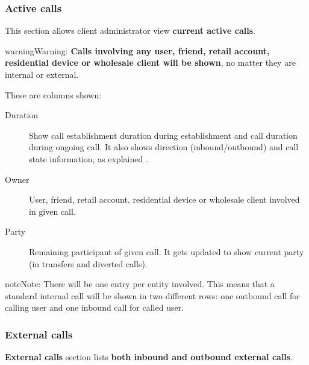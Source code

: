 \documentclass[letterpaper,10pt,english]{sphinxmanual}
\begin{document}
\subsubsection{Active calls}
\label{administration_portal/client/residential/calls/active_calls::doc}\label{administration_portal/client/residential/calls/active_calls:active-calls}
This section allows client administrator view \textbf{current active calls}.

\begin{notice}{warning}{Warning:}
\textbf{Calls involving any user, friend, retail account, residential device or wholesale client will be shown},
no matter they are internal or external.
\end{notice}

These are columns shown:
\begin{description}
\item[{Duration}] \leavevmode{}\label{administration_portal/client/residential/calls/active_calls:term-duration}
Show call establishment duration during establishment and call duration during ongoing call. It also shows
direction (inbound/outbound) and call state information, as explained {\hyperref[administration_portal/platform/active_calls:call\string-state]{}}.

\item[{Owner}] \leavevmode{}\label{administration_portal/client/residential/calls/active_calls:term-owner}
User, friend, retail account, residential device or wholesale client involved in given call.

\item[{Party}] \leavevmode{}\label{administration_portal/client/residential/calls/active_calls:term-party}
Remaining participant of given call. It gets updated to show current party (in transfers and diverted calls).

\end{description}

\begin{notice}{note}{Note:}
There will be one entry per entity involved. This means that a standard internal call will be shown
in two different rows: one outbound call for calling user and one inbound call for called user.
\end{notice}


\subsubsection{External calls}
\label{administration_portal/client/residential/calls/external_calls:id1}\label{administration_portal/client/residential/calls/external_calls::doc}\label{administration_portal/client/residential/calls/external_calls:external-calls}
\textbf{External calls} section lists \textbf{both inbound and outbound external calls}.
\end{document}
